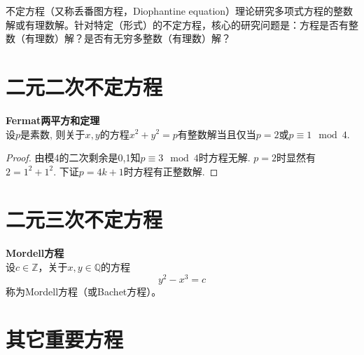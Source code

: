 
\par 不定方程（又称丢番图方程，Diophantine equation）理论研究多项式方程的整数解或有理数解。针对特定（形式）的不定方程，核心的研究问题是：方程是否有整数（有理数）解？是否有无穷多整数（有理数）解？

\section{二元二次不定方程}

\begin{thm} \textbf{Fermat两平方和定理}\\
设$p$是素数, 则关于$x,y$的方程$x^2+y^2=p$有整数解当且仅当$p=2$或$p\equiv 1\mod 4$. 
\end{thm}
\begin{proof}
\par 由模4的二次剩余是0,1知$p\equiv 3\mod 4$时方程无解. $p=2$时显然有$2=1^2+1^2$. 下证$p=4k+1$时方程有正整数解. 
\end{proof}

\section{二元三次不定方程}

\begin{dfn} \textbf{Mordell方程}\\
设$c \in \mathbb{Z}$，关于$x,y \in \mathbb{Q}$的方程
\begin{equation}
    y^2-x^3=c
\end{equation}
称为Mordell方程（或Bachet方程）。
\end{dfn}

\section{其它重要方程}

